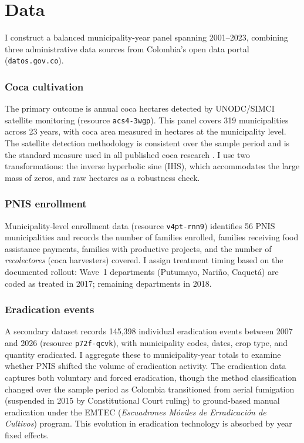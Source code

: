 \documentclass[12pt]{article}
\begin{document}
\section{Data} \label{sec:data}

I construct a balanced municipality-year panel spanning 2001--2023, combining three administrative data sources from Colombia's open data portal (\texttt{datos.gov.co}).

\subsubsection*{Coca cultivation} The primary outcome is annual coca hectares detected by UNODC/SIMCI satellite monitoring (resource \texttt{acs4-3wgp}). This panel covers 319 municipalities across 23 years, with coca area measured in hectares at the municipality level. The satellite detection methodology is consistent over the sample period and is the standard measure used in all published coca research \citep{mejia2013, unodc2017}. I use two transformations: the inverse hyperbolic sine (IHS), which accommodates the large mass of zeros, and raw hectares as a robustness check.

\subsubsection*{PNIS enrollment} Municipality-level enrollment data (resource \texttt{v4pt-rnn9}) identifies 56 PNIS municipalities and records the number of families enrolled, families receiving food assistance payments, families with productive projects, and the number of \emph{recolectores} (coca harvesters) covered. I assign treatment timing based on the documented rollout: Wave~1 departments (Putumayo, Nari\~{n}o, Caquet\'{a}) are coded as treated in 2017; remaining departments in 2018.

\subsubsection*{Eradication events} A secondary dataset records 145,398 individual eradication events between 2007 and 2026 (resource \texttt{p72f-qcvk}), with municipality codes, dates, crop type, and quantity eradicated. I aggregate these to municipality-year totals to examine whether PNIS shifted the volume of eradication activity. The eradication data captures both voluntary and forced eradication, though the method classification changed over the sample period as Colombia transitioned from aerial fumigation (suspended in 2015 by Constitutional Court ruling) to ground-based manual eradication under the EMTEC (\emph{Escuadrones M\'{o}viles de Erradicaci\'{o}n de Cultivos}) program. This evolution in eradication technology is absorbed by year fixed effects.
\end{document}
